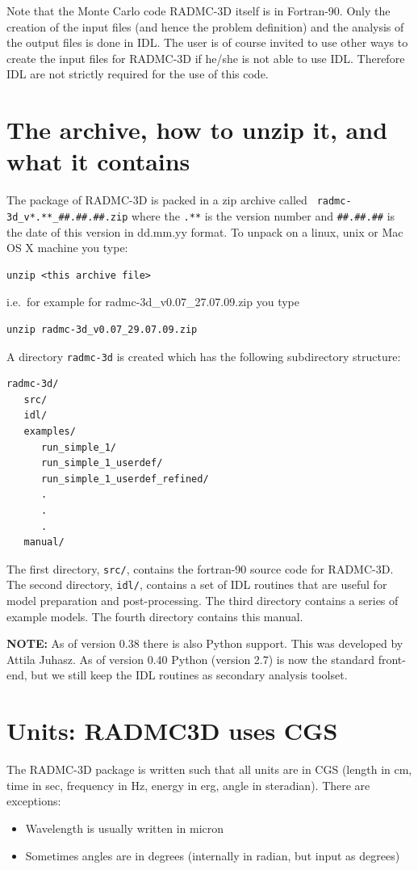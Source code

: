 \documentclass{report}
\begin{document}
Note that the Monte Carlo code RADMC-3D itself is in Fortran-90. Only the
creation of the input files (and hence the problem definition) and the
analysis of the output files is done in IDL. The user is of course invited
to use other ways to create the input files for RADMC-3D if he/she is not
able to use IDL. Therefore IDL are not strictly required for the use of this
code.


\section{The archive, how to unzip it, and what it contains}
The package of RADMC-3D is packed in a zip archive called {\small\tt
  radmc-3d\_v*.**\_\#\#.\#\#.\#\#.zip} where the {\small\tt *.**} is the version
number and {\small\tt \#\#.\#\#.\#\#} is the date of this version in dd.mm.yy
format. To unpack on a linux, unix or Mac OS X machine you type:
{\small\begin{verbatim}
unzip <this archive file>
\end{verbatim}}
i.e.\ for example for radmc-3d\_v0.07\_27.07.09.zip you type
{\small\begin{verbatim}
unzip radmc-3d_v0.07_29.07.09.zip
\end{verbatim}}
A directory {\small\tt radmc-3d} is created which has the following subdirectory
structure:
{\small\begin{verbatim}
radmc-3d/
   src/
   idl/
   examples/
      run_simple_1/
      run_simple_1_userdef/
      run_simple_1_userdef_refined/
      .
      .
      .
   manual/
\end{verbatim}}
The first directory, {\small\tt src/}, contains the fortran-90 source code for
RADMC-3D. The second directory, {\small\tt idl/}, contains a set of IDL routines
that are useful for model preparation and post-processing. The third
directory contains a series of example models. The fourth directory contains
this manual.

{\bf NOTE:} As of version 0.38 there is also Python support. This was
developed by Attila Juhasz. As of version 0.40 Python (version 2.7) is now
the standard front-end, but we still keep the IDL routines as secondary
analysis toolset.


\section{Units: RADMC3D uses CGS}
The RADMC-3D package is written such that all units are in CGS (length in
cm, time in sec, frequency in Hz, energy in erg, angle in steradian). There
are exceptions:
\begin{itemize}
\item Wavelength is usually written in micron
\item Sometimes angles are in degrees (internally in radian, but input as degrees)
\end{itemize}
\end{document}
